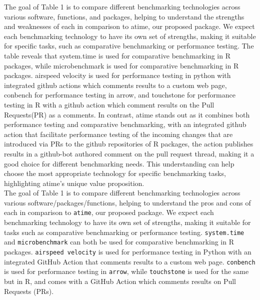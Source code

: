 \noindent The goal of Table 1 is to compare different benchmarking technologies across various software, functions, and packages, helping to understand the strengths and weaknesses of each in comparison to atime, our proposed package. We expect each benchmarking technology to have its own set of strengths, making it suitable for specific tasks, such as comparative benchmarking or performance testing. The table reveals that system.time is used for comparative benchmarking in R packages, while microbenchmark is used for comparative benchmarking in R packages. airspeed velocity is used for performance testing in python with integrated github actions which comments results to a custom web page, conbench for performance testing in arrow, and touchstone for performance testing in R with a github action which comment results on the Pull Requests(PR) as a comments. In contrast, atime stands out as it combines both performance testing and comparative benchmarking, with an integrated github action that facilitate performance testing of the incoming changes that are introduced via PRs to the github repositories of R packages, the action publishes results in a github-bot authored comment on the pull request thread, making it a good choice for different benchmarking needs. This understanding can help choose the most appropriate technology for specific benchmarking tasks, highlighting atime's unique value proposition. \\

\noindent The goal of Table 1 is to compare different benchmarking technologies across various software/packages/functions, helping to understand the pros and cons of each in comparison to \texttt{atime}, our proposed package. We expect each benchmarking technology to have its own set of strengths, making it suitable for tasks such as comparative benchmarking or performance testing. \texttt{system.time} and \texttt{microbenchmark} can both be used for comparative benchmarking in R packages. \texttt{airspeed velocity} is used for performance testing in Python with an integrated GitHub Action that comments results to a custom web page. \texttt{conbench} is used for performance testing in \texttt{arrow}, while \texttt{touchstone} is used for the same but in R, and comes with a GitHub Action which comments results on Pull Requests (PRs).



